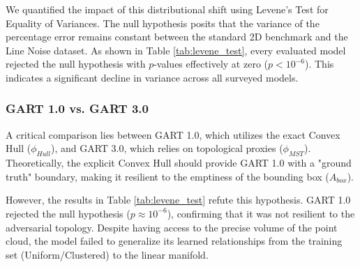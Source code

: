\documentclass{article}
\begin{document}
We quantified the impact of this distributional shift using Levene's Test for Equality of Variances. The null hypothesis posits that the variance of the percentage error remains constant between the standard 2D benchmark and the Line Noise dataset. As shown in Table \ref{tab:levene_test}, every evaluated model rejected the null hypothesis with $p$-values effectively at zero ($p < 10^{-6}$). This indicates a significant decline in variance across all surveyed models.

\begin{table}[ht]
\centering
\caption{Levene's Test for Variance Stability (Standard vs. Line Noise). The extremely low p-values indicate that all models exhibit statistically significant performance degradation or alteration when exposed to linear topologies.}
\label{tab:levene_test}
\end{table}

\subsubsection{GART 1.0 vs. GART 3.0}
A critical comparison lies between GART 1.0, which utilizes the exact Convex Hull ($\phi_{Hull}$), and GART 3.0, which relies on topological proxies ($\phi_{MST}$). Theoretically, the explicit Convex Hull should provide GART 1.0 with a "ground truth" boundary, making it resilient to the emptiness of the bounding box ($A_{box}$).

However, the results in Table \ref{tab:levene_test} refute this hypothesis. GART 1.0 rejected the null hypothesis ($p \approx 10^{-6}$), confirming that it was not resilient to the adversarial topology. Despite having access to the precise volume of the point cloud, the model failed to generalize its learned relationships from the training set (Uniform/Clustered) to the linear manifold. 
\end{document}
